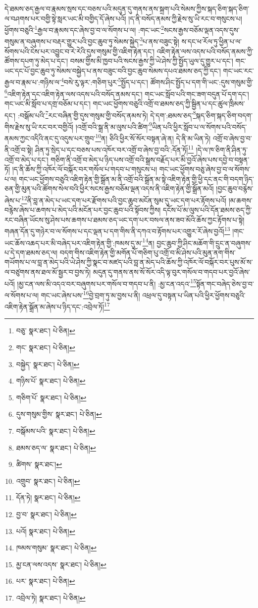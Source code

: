 དེ་ཐམས་ཅད་རྒྱལ་བ་རྣམས་སྲས་དང་བཅས་པའི་མདུན་དུ་གནས་ནས་སྐྲག་པའི་སེམས་ཀྱིས་སྐད་ཅིག་སྐད་ཅིག་ལ་བཤགས་པར་བགྱི་སྟེ་སླར་ཡང་མི་བགྱིད་དོ་ཞེས་པའོ། །ད་ནི་བསོད་ནམས་ཀྱི་རྗེས་སུ་ཡི་རང་བ་གསུངས་པ། ཕྱོགས་བཅུའི་\footnote{བཅུ་  སྣར་ཐང་།  པེ་ཅིན། }རྒྱལ་བ་རྣམས་དང་ཞེས་བྱ་བ་ལ་སོགས་པ་ལ། :གང་ཡང་\footnote{གང་  སྣར་ཐང་།  པེ་ཅིན། }སངས་རྒྱས་བཅོམ་ལྡན་འདས་དུས་གསུམ་ན་བཞུགས་པ་བརྡར་གྱུར་པའི་བྱང་ཆུབ་ཏུ་སེམས་སྐྱེད་\footnote{བསྐྱེད་  སྣར་ཐང་།  པེ་ཅིན། }པ་ནས་བཟུང་སྟེ། ས་དང་ཕ་རོལ་ཏུ་ཕྱིན་པ་ལ་སོགས་པའི་ངེས་པར་འབྱུང་བ་རེ་རེའི་དུས་གསུམ་གྱི་འཇིག་རྟེན་དང་། འཇིག་རྟེན་ལས་འདས་པའི་བསོད་ནམས་ཀྱི་ཚོགས་དཔག་ཏུ་མེད་པ་དང་། བསམ་གྱིས་མི་ཁྱབ་པའི་སངས་རྒྱས་ཀྱི་ཡེ་ཤེས་ཀྱི་སྤྱོད་ཡུལ་དུ་གྱུར་པ་དང་། གང་ཡང་དང་པོ་བྱང་ཆུབ་ཏུ་སེམས་བསྐྱེད་པ་ནས་བཟུང་བའི་བྱང་ཆུབ་སེམས་དཔའ་ཐམས་ཅད་ཀྱི་དང་། གང་ཡང་རང་རྒྱལ་བ་རྣམ་པ་:གཉིས་ལ་\footnote{གཉིས་པོ་  སྣར་ཐང་།  པེ་ཅིན། }བསེ་རུ་ལྟར་:གཅིག་པུར་\footnote{གཅིག་པོ་  སྣར་ཐང་།  པེ་ཅིན། }སྤྱོད་པ་དང་། ཚོགས་ཤིང་སྤྱོད་པ་དག་གི་ཡང་:དུས་གསུམ་གྱི་\footnote{དུས་གསུམ་གྱིས་  སྣར་ཐང་།  པེ་ཅིན། }འཇིག་རྟེན་དང་འཇིག་རྟེན་ལས་འདས་པའི་བསོད་ནམས་དང་། གང་ཡང་སློབ་པའི་གང་ཟག་བདུན་པོ་དག་དང་། གང་ཡང་མི་སློབ་པ་དགྲ་བཅོམ་པ་དང་། གང་ཡང་ཕྱོགས་བཅུའི་འགྲོ་བ་ཐམས་ཅད་ཀྱི་སྦྱིན་པ་དང་ཚུལ་ཁྲིམས་དང་། :བསྒོམ་པའི་\footnote{བསྒོམས་པའི་  སྣར་ཐང་།  པེ་ཅིན། }རང་བཞིན་གྱི་དུས་གསུམ་གྱི་བསོད་ནམས་ཏེ། དེ་དག་:ཐམས་ཅད་\footnote{ཐམས་ཅད་ལ་  སྣར་ཐང་།  པེ་ཅིན། }སྐད་ཅིག་སྐད་ཅིག་བདག་གིས་རྗེས་སུ་ཡི་རང་བར་བགྱིའོ། །འགྲོ་བའི་སྒྲ་ནི་མ་ལུས་པའི་ཚིག་\footnote{ཚིགས་  སྣར་ཐང་། }ཡིན་པའི་ཕྱིར་སློབ་པ་ལ་སོགས་པའི་བསོད་ནམས་ཀྱང་འདིའི་ནང་དུ་འདུས་པར་གྲུབ་\footnote{འགྲུབ་  སྣར་ཐང་།  པེ་ཅིན། }ན། ཅིའི་ཕྱིར་སོ་སོར་བསྟན་ཞེ་ན། དེ་ནི་མ་ཡིན་ཏེ། འགྲོ་བ་ཞེས་བྱ་བ་ནི་འགྲོ་བ་སྟེ། ཤིན་ཏུ་སྲེད་པ་དང་བཅས་པས་འཁོར་བར་འགྲོ་བ་ཞེས་བྱ་བའི་:དོན་ཏོ།\footnote{དོན་ཏེ།  སྣར་ཐང་།  པེ་ཅིན། } །དེ་ལ་ཁ་ཅིག་ནི་ཤིན་ཏུ་འགྲོ་བ་མེད་པ་དང་། གཅིག་ནི་འགྲོ་བ་མེད་པ་ཉིད་པས་འགྲོ་བའི་སྒྲས་བརྗོད་པར་མི་བྱའོ་ཞེས་པས་དབྱེ་བ་བསྟན་ཏོ། །ད་ནི་ཆོས་ཀྱི་འཁོར་ལོ་བསྐོར་བར་གསོལ་པ་གདབ་པ་གསུངས་པ། གང་ཡང་ཕྱོགས་བཅུ་ཞེས་བྱ་བ་ལ་སོགས་པ་ལ། གང་ཡང་ཕྱོགས་བཅུའི་འཇིག་རྟེན་གྱི་སྒྲོན་མ་ནི་འགྲོ་བའི་སྒྲོན་མ་སྟེ་འཇིག་རྟེན་གྱི་ཕྱི་དང་ནང་གི་བདག་ཉིད་ཅན་གྱི་མུན་པའི་ཚོགས་སེལ་བའི་ཕྱིར་སངས་རྒྱས་བཅོམ་ལྡན་འདས་ནི་འཇིག་རྟེན་གྱི་སྒྲོན་མའོ། །བྱང་ཆུབ་བརྙེས་ཞེས་པ་\footnote{བྱ་བ་  སྣར་ཐང་།  པེ་ཅིན། }ནི་བླ་ན་མེད་པ་ཡང་དག་པར་རྫོགས་པའི་བྱང་ཆུབ་མངོན་སུམ་དུ་ཡང་དག་པར་རྟོགས་པའོ། །མ་ཆགས་བརྙེས་ཞེས་པ་ཆགས་པ་མེད་པའི་མངོན་པར་བྱང་ཆུབ་པའི་སྟོབས་ཀྱིས། དངོས་པོ་མ་ལུས་པའི་དོན་ཐམས་ཅད་ཀྱི་རང་བཞིན་ཡོངས་སུ་ཤེས་པས་ཆགས་པ་ཐམས་ཅད་ཡང་དག་པར་བསལ་ནས་ཟབ་མོའི་ཆོས་ཀྱང་རྟོགས་པ་སྟེ། གཞན་དོན་དུ་གཉེར་བ་ལ་སོགས་པ་དང་ལྡན་པ་དག་གིས་ནི་དཀའ་བ་རྟོགས་པར་འགྱུར་རོ་ཞེས་བྱའོ།\footnote{པའོ།  སྣར་ཐང་།  པེ་ཅིན། } །གང་ཡང་ཆོས་འཆད་པར་མི་བཞེད་པར་འཇིག་རྟེན་གྱི་:ཁམས་དུ་མ་\footnote{ཁམས་གསུམ་  སྣར་ཐང་།  པེ་ཅིན། }ན། བྱང་ཆུབ་ཀྱི་ཤིང་མཆོག་གི་དྲུང་ན་བཞུགས་པ་དེ་དག་ཐམས་ཅད་ལ། བདག་གིས་འཇིག་རྟེན་གྱི་མགོན་པོ་གཅིག་པུ་འགྲོ་བ་མི་ཤེས་པའི་མུན་ནག་གིས་གཡོགས་པ་ལ་བླ་ན་མེད་པའི་ཡེ་ཤེས་ཀྱི་སྣང་བ་མཛད་པའི་བླ་ན་མེད་པའི་ཆོས་ཀྱི་འཁོར་ལོ་བསྐོར་བར་པུས་མོ་ས་ལ་བཙུགས་ནས་ཐལ་མོ་སྦྱར་བ་བྱས་ཏེ། མདུན་དུ་གནས་ནས་སོ་སོར་འདི་ལྟ་བུར་གསོལ་བ་གདབ་པར་བྱའོ་ཞེས་པའོ། །མྱ་ངན་ལས་མི་འདའ་བར་བཞུགས་པར་གསོལ་བ་གདབ་པ་ནི། :མྱ་ངན་འདའ་\footnote{མྱ་ངན་ལས་འདས་  སྣར་ཐང་།  པེ་ཅིན། }སྟོན་གང་བཞེད་ཅེས་བྱ་བ་ལ་སོགས་པ་ལ། གང་ཡང་ཞེས་པས་\footnote{པར་  སྣར་ཐང་།  པེ་ཅིན། }བྱེ་བྲག་ཏུ་མ་བྱས་པ་ནི། འཕྲལ་དུ་བསྟན་པ་ཡིན་པའི་ཕྱིར་ཕྱོགས་བཅུའི་འཇིག་རྟེན་སྒྲོན་མ་ཞེས་པ་ཉིད་དང་:འབྲེལ་ཏོ།\footnote{འབྲེལ་ཏེ།  སྣར་ཐང་།  པེ་ཅིན། } 